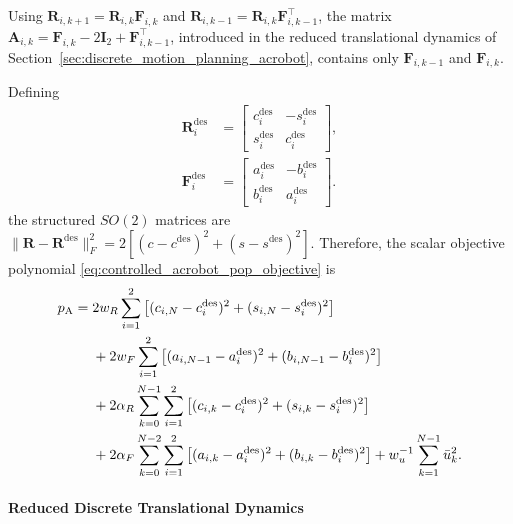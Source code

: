 Using \(\bm{R}_{i,k+1}=\bm{R}_{i,k}\bm{F}_{i,k}\) and
\(\bm{R}_{i,k-1}=\bm{R}_{i,k}\bm{F}_{i,k-1}^{\top}\), the matrix
\(\bm{A}_{i,k}=\bm{F}_{i,k}-2\bm{I}_2+\bm{F}_{i,k-1}^{\top}\), introduced in the reduced
translational dynamics of Section~\ref{sec:discrete_motion_planning_acrobot},
contains only \(\bm{F}_{i,k-1}\) and
\(\bm{F}_{i,k}\).

Defining
\begin{equation}
\begin{aligned}
\bm{R}_i^{\mathrm{des}}
&=\begin{bmatrix}c_i^{\mathrm{des}}&-s_i^{\mathrm{des}}\\
s_i^{\mathrm{des}}&c_i^{\mathrm{des}}\end{bmatrix},\\
\bm{F}_i^{\mathrm{des}}
&=\begin{bmatrix}a_i^{\mathrm{des}}&-b_i^{\mathrm{des}}\\
b_i^{\mathrm{des}}&a_i^{\mathrm{des}}\end{bmatrix}.
\end{aligned}
\label{eq:app_acrobot_desired_rotations}
\end{equation}
the structured \(SO(2)\) matrices are
\(\|\bm{R}-\bm{R}^{\mathrm{des}}\|_F^2=2[(c-c^{\mathrm{des}})^2+
(s-s^{\mathrm{des}})^2]\). Therefore, the scalar objective polynomial \eqref{eq:controlled_acrobot_pop_objective} is
\begin{align}
p_{\mathrm A}=\;&2w_R\sum_{i=1}^{2}
\left[(c_{i,N}-c_i^{\mathrm{des}})^2
     +(s_{i,N}-s_i^{\mathrm{des}})^2\right]
\notag\\
&+2w_F\sum_{i=1}^{2}
\left[(a_{i,N-1}-a_i^{\mathrm{des}})^2
     +(b_{i,N-1}-b_i^{\mathrm{des}})^2\right]
\notag\\
&+2\alpha_R\sum_{k=0}^{N-1}\sum_{i=1}^{2}
\left[(c_{i,k}-c_i^{\mathrm{des}})^2
     +(s_{i,k}-s_i^{\mathrm{des}})^2\right]
\notag\\
&+2\alpha_F\sum_{k=0}^{N-2}\sum_{i=1}^{2}
\left[(a_{i,k}-a_i^{\mathrm{des}})^2
     +(b_{i,k}-b_i^{\mathrm{des}})^2\right]
+w_u^{-1}\sum_{k=1}^{N-1}\bar u_k^2.
\label{eq:app_acrobot_scalar_objective}
\end{align}

\paragraph{Reduced Discrete Translational Dynamics}

